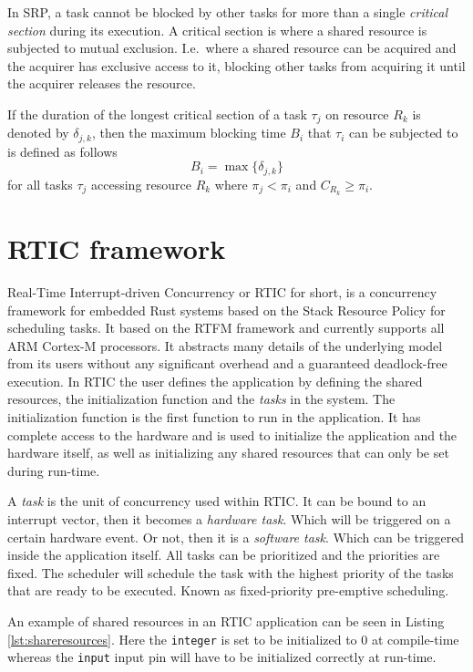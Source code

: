In SRP, a task cannot be blocked by other tasks for more than a single
\emph{critical section} during its execution. A critical section is where a
shared resource is subjected to mutual exclusion. I.e.\ where a shared resource
can be acquired and the acquirer has exclusive access to it, blocking other
tasks from acquiring it until the acquirer releases the resource.

If the duration of the longest critical section of a task $\tau_j$ on resource
$R_k$ is denoted by $\delta_{j,k}$, then the maximum blocking time $B_i$
that $\tau_i$ can be subjected to is defined as follows
\begin{equation}
    B_i = \max\{\delta_{j,k}\}
\end{equation}
for all tasks $\tau_j$ accessing resource $R_k$ where $\pi_j < \pi_i$ and
$C_{R_k} \geq \pi_i$.

\section{RTIC framework}
Real-Time Interrupt-driven Concurrency or RTIC for short, is a concurrency
framework for embedded Rust systems based on the Stack Resource Policy for
scheduling tasks. It based on the RTFM framework\cite{rtfm} and currently
supports all ARM Cortex-M processors. It abstracts many details of the underlying
model from its users without any significant overhead and a guaranteed
deadlock-free execution. In RTIC the user defines the application by defining
the shared resources, the initialization function and the \emph{tasks} in the
system. The initialization function is the first function to run in the
application. It has complete access to the hardware and is used to initialize
the application and the hardware itself, as well as initializing any shared
resources that can only be set during run-time.

A \emph{task} is the unit of concurrency used within RTIC. It can be bound to
an interrupt vector, then it becomes a \emph{hardware task}. Which will be
triggered on a certain hardware event. Or not, then it is a \emph{software
task}. Which can be triggered inside the application itself. All tasks can be
prioritized and the priorities are fixed. The scheduler will schedule
the task with the highest priority of the tasks that are ready to be executed.
Known as fixed-priority pre-emptive scheduling\cite{fixedpriorityhistory}.

An example of shared resources in an RTIC application can be seen in Listing
\ref{lst:shareresources}. Here the \texttt{integer} is set to be initialized to
$0$ at compile-time whereas the \texttt{input} input pin will have to be initialized
correctly at run-time.


